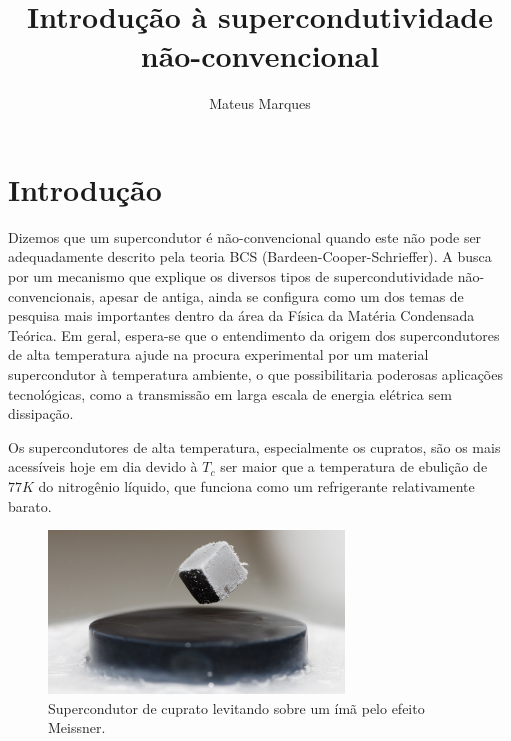 \documentclass[a4paper,10pt]{article}
\title{\Huge{\textbf{Introdução à supercondutividade não-convencional}}}
\author{Mateus Marques}
\begin{document}
\maketitle

\section{Introdução}

Dizemos que um supercondutor é não-convencional quando este não pode ser adequadamente descrito pela teoria BCS (Bardeen-Cooper-Schrieffer). A busca por um mecanismo que explique os diversos tipos de supercondutividade não-convencionais, apesar de antiga, ainda se configura como um dos temas de pesquisa mais importantes dentro da área da Física da Matéria Condensada Teórica. Em geral, espera-se que o entendimento da origem dos supercondutores de alta temperatura ajude na procura experimental por um material supercondutor à temperatura ambiente, o que possibilitaria poderosas aplicações tecnológicas, como a transmissão em larga escala de energia elétrica sem dissipação.

Os supercondutores de alta temperatura, especialmente os cupratos, são os mais acessíveis hoje em dia devido à $T_c$ ser maior que a temperatura de ebulição de $77 \unit{K}$ do nitrogênio líquido, que funciona como um refrigerante relativamente barato.

\begin{figure}[H]
\centering
\includegraphics[width=0.7\textwidth]{fig/levitating.jpg}
\caption{Supercondutor de cuprato levitando sobre um ímã pelo efeito Meissner.}
\label{fig:levitating}
\end{figure}

\end{document}

